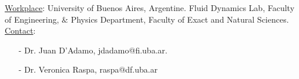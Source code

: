 \documentclass[english,12pt,a4paper]{article}
\begin{document}
	\vspace{1 cm}\noindent \underline{Workplace}: University of Buenos Aires, Argentine. Fluid Dynamics Lab, Faculty of Engineering, $\&$ Physics Department, Faculty of Exact and Natural Sciences. \\
	
	\noindent\underline{Contact}:
	\begin{itemize}\itemsep -5pt
		\item[-] Dr. Juan D'Adamo, jdadamo@fi.uba.ar. 
		\item[-] Dr. Veronica Raspa, raspa@df.uba.ar
	\end{itemize}
	
	
	
	
	
\end{document}
